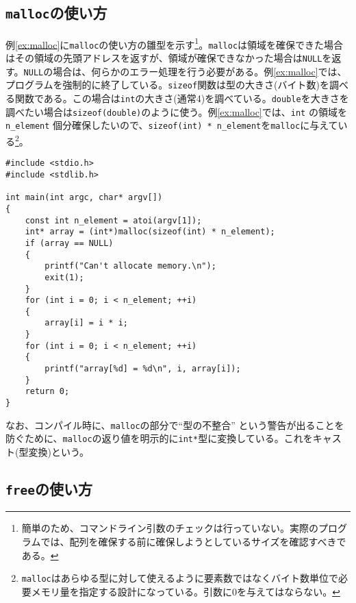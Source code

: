 \subsection{\texttt{malloc}の使い方}

例\ref{ex:malloc}に\texttt{malloc}の使い方の雛型を示す\footnote{簡単のため、コマンドライン引数のチェックは行っていない。実際のプログラムでは、配列を確保する前に確保しようとしているサイズを確認すべきである。}。\texttt{malloc}は領域を確保できた場合はその領域の先頭アドレスを返すが、領域が確保できなかった場合は\texttt{NULL}を返す。\texttt{NULL}の場合は、何らかのエラー処理を行う必要がある。例\ref{ex:malloc}では、プログラムを強制的に終了している。\texttt{sizeof}関数は型の大きさ(バイト数)を調べる関数である。この場合は\texttt{int}の大きさ(通常4)を調べている。\texttt{double}を大きさを調べたい場合は\texttt{sizeof(double)}のように使う。例\ref{ex:malloc}では、\texttt{int} の領域を \texttt{n\_element} 個分確保したいので、\texttt{sizeof(int) * n\_element}を\texttt{malloc}に与えている\footnote{\texttt{malloc}はあらゆる型に対して使えるように要素数ではなくバイト数単位で必要メモリ量を指定する設計になっている。引数に\(0\)を与えてはならない。}。
\begin{reidai}\label{ex:malloc}
    \begin{verbatim}
#include <stdio.h>
#include <stdlib.h>

int main(int argc, char* argv[])
{
    const int n_element = atoi(argv[1]);
    int* array = (int*)malloc(sizeof(int) * n_element);
    if (array == NULL)
    {
        printf("Can't allocate memory.\n");
        exit(1);
    }
    for (int i = 0; i < n_element; ++i)
    {
        array[i] = i * i;
    }
    for (int i = 0; i < n_element; ++i)
    {
        printf("array[%d] = %d\n", i, array[i]);
    }
    return 0;
}
\end{verbatim}
\end{reidai} \noindent
なお、コンパイル時に、\texttt{malloc}の部分で``型の不整合'' という警告が出ることを防ぐために、\texttt{malloc}の返り値を明示的に\texttt{int*}型に変換している。これをキャスト(型変換)という。

\subsection{\texttt{free}の使い方}

